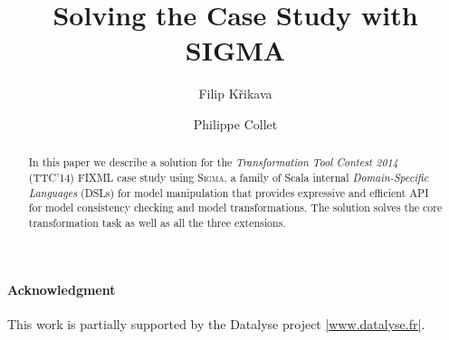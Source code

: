 \documentclass[submission]{eptcs}
\title{Solving the \TTC \FIXML Case Study with SIGMA}
\author{
  Filip Křikava
  \institute{University Lille 1 - LIFL, France}
  \institute{INRIA Lille, Nord Europe}
  \email{\href{mailto:filip.krikava@inria.fr}{filip.krikava@inria.fr}}
\and
  Philippe Collet
  \institute{Université Nice - Sophia Antipolis, France}
  \institute{CNRS, I3S, UMR 7271}
  \email{\quad \href{mailto:philippe.collet@unice.fr}{philippe.collet@unice.fr}}
}
\newcommand{\SIGMA}{\textsc{Sigma}\xspace}
\newcommand{\TTC}{TTC'14\xspace}
\newcommand{\Scala}{\scalainline}
\begin{document}
\maketitle

\begin{abstract}
In this paper we describe a solution for the \emph{Transformation Tool Contest 2014} (\TTC) FIXML case study using \SIGMA, a family of Scala internal \emph{Domain-Specific Languages} (DSLs) for model manipulation that provides expressive and efficient API for model consistency checking and model transformations.
The solution solves the core transformation task as well as all the three extensions.
\end{abstract}






\paragraph{Acknowledgment}
This work is partially supported by the Datalyse project \href{http://www.datalyse.fr/}{\Scala|www.datalyse.fr|}.


	

\appendix


\end{document}
